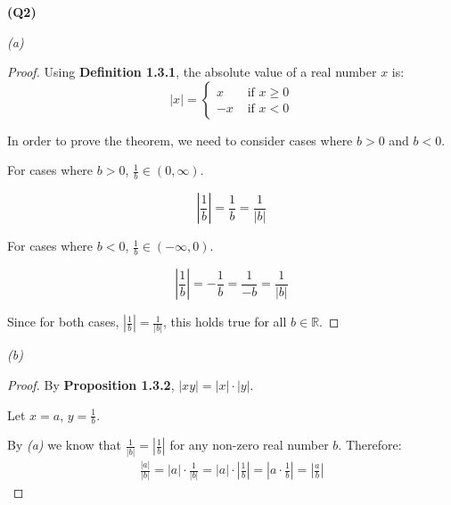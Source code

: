 \documentclass[12pt, a4paper]{article}
\newcommand{\R}{\mathbb{R}}
\begin{document}
\noindent\textbf{(Q2)}

\noindent\textit{(a)}
\begin{proof}
    Using \textbf{Definition 1.3.1}, the absolute value of a real number $x$ is:
    \[
        |x| = \begin{cases}
            x & \text{ if } x \geq 0\\
            -x & \text{ if } x < 0
        \end{cases}
    \]

    In order to prove the theorem, we need to consider cases where $b > 0$ and $b < 0$.

    For cases where $b > 0$, $\tfrac{1}{b} \in (0, \infty)$.

    \[
        \left|\frac{1}{b}\right| = \frac{1}{b} = \frac{1}{|b|}
    \]
    
    For cases where $b < 0$, $\tfrac{1}{b} \in (-\infty, 0)$.

    \[
        \left|\frac{1}{b}\right| = -\frac{1}{b} = \frac{1}{-b} = \frac{1}{|b|}
    \]

    Since for both cases, $\left|\frac{1}{b}\right| = \frac{1}{|b|}$, this holds true for
    all $b \in \R$.
\end{proof}

\noindent\textit{(b)}
\begin{proof}
    By \textbf{Proposition 1.3.2}, $|xy| = |x| \cdot |y|$.

    Let $x = a$, $y = \tfrac{1}{b}$.

    By \textit{(a)} we know that $\tfrac{1}{|b|} = \left|\tfrac{1}{b}\right|$ for any
    non-zero real number $b$. Therefore:
    \begin{align*}
        \frac{|a|}{|b|} 
        = |a| \cdot \frac{1}{|b|}
        = |a| \cdot \left|\frac{1}{b}\right|
        = \left|a \cdot \frac{1}{b} \right|
        = \left|\frac{a}{b}\right|
    \end{align*}
\end{proof}
\end{document}
